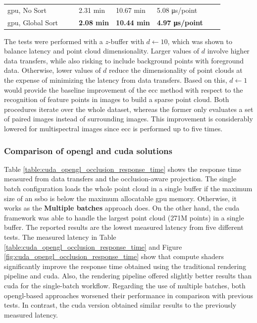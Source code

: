 \begin{table}
\begin{tabular}{l@{\hskip 0.06in}|lll|l|l|l|l}
    \acrshort{gpu}, No Sort & & & 2.31 \si{\minute} & 10.67 \si{\minute} & 5.08 \si{\micro\second}/point & &\\
    \acrshort{gpu}, Global Sort & & & \textbf{2.08 \si{\minute}} & \textbf{10.44 \si{\minute}} & \textbf{4.97 \si{\micro\second}/point} & &\\
    \bottomrule
    \end{tabular}
\end{table}
\renewcommand{\arraystretch}{1}

The tests were performed with a $z$-buffer with $d \gets 10$, which was shown to balance latency and point cloud dimensionality. Larger values of $d$ involve higher data transfers, while also risking to include background points with foreground data. Otherwise, lower values of $d$ reduce the dimensionality of point clouds at the expense of minimizing the latency from data transfers. Based on this, $d \gets 1$ would provide the baseline improvement of the \acrshort{ecc} method with respect to the recognition of feature points in images to build a sparse point cloud. Both procedures iterate over the whole dataset, whereas the former only evaluates a set of paired images instead of surrounding images. This improvement is considerably lowered for multispectral images since \acrshort{ecc} is performed up to five times. 

\subsubsection{Comparison of \acrshort{opengl} and \acrshort{cuda} solutions}

Table \ref{table:cuda_opengl_occlusion_response_time} shows the response time measured from data transfers and the occlusion-aware projection. The single batch configuration loads the whole point cloud in a single buffer if the maximum size of an \acrshort{ssbo} is below the maximum allocatable \acrshort{gpu} memory. Otherwise, it works as the \textbf{Multiple batches} approach does. On the other hand, the \acrshort{cuda} framework was able to handle the largest point cloud (271M points) in a single buffer. The reported results are the lowest measured latency from five different tests. The measured latency in Table \ref{table:cuda_opengl_occlusion_response_time} and Figure \ref{fig:cuda_opengl_occlusion_response_time} show that compute shaders significantly improve the response time obtained using the traditional rendering pipeline and \acrshort{cuda}. Also, the rendering pipeline offered slightly better results than \acrshort{cuda} for the single-batch workflow. Regarding the use of multiple batches, both \acrshort{opengl}-based approaches worsened their performance in comparison with previous tests. In contrast, the \acrshort{cuda} version obtained similar results to the previously measured latency. 

